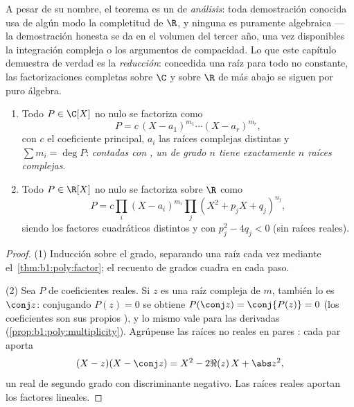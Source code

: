 \begin{remark}
A pesar de su nombre, el teorema es un  de \emph{análisis}:
toda demostración conocida usa de algún modo la completitud de $\R$, y
ninguna es puramente algebraica --- la demostración honesta se da en el
volumen del tercer año, una vez disponibles la integración compleja o
los argumentos de compacidad. Lo que este capítulo demuestra de verdad
es la \emph{reducción}: concedida una raíz para todo  no
constante, las factorizaciones completas sobre $\C$ y sobre $\R$ de más
abajo se siguen por puro álgebra.
\end{remark}

\begin{corollary}\label{cor:b1:poly:factorization}
\begin{enumerate}
  \item Todo $P \in \C[X]$ no nulo se factoriza como
        \[
        P = c\, (X - a_1)^{m_1} \cdots (X - a_r)^{m_r},
        \]
        con $c$ el coeficiente principal, $a_i$ las raíces complejas
        distintas y $\sum m_i = \deg P$: \emph{contadas con
        , un  de grado $n$ tiene exactamente $n$
        raíces complejas}.
  \item Todo $P \in \R[X]$ no nulo se factoriza sobre $\R$ como
        \[
        P = c \prod_i (X - a_i)^{m_i} \prod_j (X^2 + p_j X +
        q_j)^{n_j},
        \]
        siendo los factores cuadráticos distintos y con
        $p_j^2 - 4q_j < 0$ (sin raíces reales).
\end{enumerate}
\end{corollary}

\begin{proof}
(1) Inducción sobre el grado, separando una raíz cada vez mediante
el~\cref{thm:b1:poly:factor}; el recuento de grados cuadra en cada paso.

(2) Sea $P$ de coeficientes reales. Si $z$ es una raíz compleja de
 $m$, también lo es $\conj z$: conjugando $P(z) = 0$ se
obtiene $P(\conj z) = \conj{P(z)} = 0$ (los coeficientes son sus
propios ), y lo mismo vale para las derivadas
(\cref{prop:b1:poly:multiplicity}). Agrúpense las raíces no reales en
pares : cada par aporta
\[
(X - z)(X - \conj z) = X^2 - 2\Re(z)\, X + \abs z^2 ,
\]
un  real de segundo grado con discriminante negativo. Las
raíces reales aportan los factores lineales.
\end{proof}

